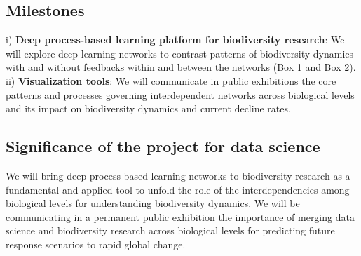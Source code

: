 \documentclass[11pt]{article}
\begin{document}
\subsection*{Milestones}
i) {\bf Deep process-based learning platform for biodiversity
  research}: We will explore deep-learning networks to contrast
patterns of biodiversity dynamics with and without feedbacks within and between the networks (Box 1 and Box 2).\\
ii) {\bf Visualization tools}: We will communicate in public
exhibitions the core patterns and processes governing interdependent
networks across biological levels and its impact on biodiversity
dynamics and current decline rates.
\subsection*{Significance of the project for data science}
We will bring deep process-based learning networks to biodiversity
research as a fundamental and applied tool to unfold the role of the
interdependencies among biological levels for understanding
biodiversity dynamics. We will be communicating in a permanent public
exhibition the importance of merging data science and biodiversity
research across biological levels for predicting future response
scenarios to rapid global change.  \vspace{-1.25 in}
\end{document}
